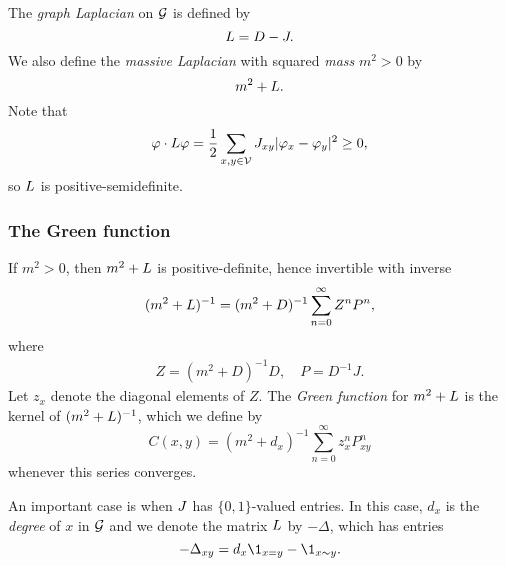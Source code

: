 The \emph{graph Laplacian} on $\mathcal{G}$ is defined by
\begin{equation}
L = D - J.
\end{equation}
We also define the \emph{massive Laplacian} with squared \emph{mass} $m^2 > 0$
by
\begin{equation}
m^2 + L.
\end{equation}
Note that
\begin{equation}
\varphi \cdot L \varphi
  =
\frac{1}{2} \sum_{x,y\in\mathcal{V}} J_{xy} |\varphi_x - \varphi_y|^2
  \ge
0,
\end{equation}
so $L$ is positive-semidefinite.

\subsubsection{The Green function}

If $m^2 > 0$, then $m^2 + L$ is positive-definite, hence invertible with inverse
\begin{equation}
(m^2 + L)^{-1} = (m^2 + D)^{-1} \sum_{n=0}^\infty Z^n P^n,
\end{equation}
where
\begin{align}
Z = (m^2 + D)^{-1} D,
  \quad
P = D^{-1} J.
\end{align}
Let $z_x$ denote the diagonal elements of $Z$.
The \emph{Green function} for $m^2 + L$ is the kernel of $(m^2 + L)^{-1}$, which we define by
\begin{equation}
C(x, y)
  =
(m^2 + d_x)^{-1} \sum_{n=0}^\infty z_x^n P^n_{xy}
\end{equation}
whenever this series converges.

\begin{example}
An important case is when $J$ has $\{0, 1 \}$-valued entries. In this case, $d_x$ is the
\emph{degree} of $x$ in $\mathcal{G}$ and we denote the matrix $L$ by $-\Delta$, which has
entries
\begin{equation}
-\Delta_{xy} = d_x \1_{x=y} - \1_{x \sim y}.
\end{equation}
\end{example}


